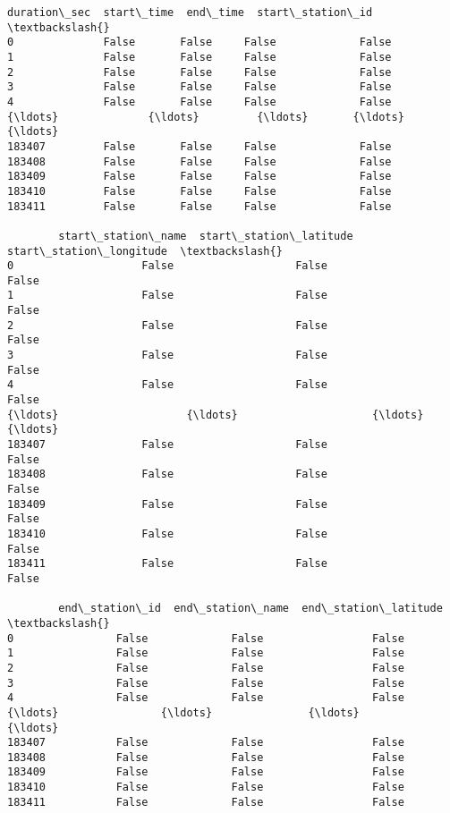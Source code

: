 \documentclass[11pt]{article}
\makeatletter
\newcommand{\boxspacing}{\kern\kvtcb@left@rule\kern\kvtcb@boxsep}
\newcommand{\prompt}[4]{
        {\ttfamily\llap{{\color{#2}[#3]:\hspace{3pt}#4}}\vspace{-\baselineskip}}
    }
\makeatother
\begin{document}
            \begin{tcolorbox}[breakable, size=fbox, boxrule=.5pt, pad at break*=1mm, opacityfill=0]
\prompt{Out}{outcolor}{11}{\boxspacing}
\begin{Verbatim}[commandchars=\\\{\}]
        duration\_sec  start\_time  end\_time  start\_station\_id  \textbackslash{}
0              False       False     False             False
1              False       False     False             False
2              False       False     False             False
3              False       False     False             False
4              False       False     False             False
{\ldots}              {\ldots}         {\ldots}       {\ldots}               {\ldots}
183407         False       False     False             False
183408         False       False     False             False
183409         False       False     False             False
183410         False       False     False             False
183411         False       False     False             False

        start\_station\_name  start\_station\_latitude  start\_station\_longitude  \textbackslash{}
0                    False                   False                    False
1                    False                   False                    False
2                    False                   False                    False
3                    False                   False                    False
4                    False                   False                    False
{\ldots}                    {\ldots}                     {\ldots}                      {\ldots}
183407               False                   False                    False
183408               False                   False                    False
183409               False                   False                    False
183410               False                   False                    False
183411               False                   False                    False

        end\_station\_id  end\_station\_name  end\_station\_latitude  \textbackslash{}
0                False             False                 False
1                False             False                 False
2                False             False                 False
3                False             False                 False
4                False             False                 False
{\ldots}                {\ldots}               {\ldots}                   {\ldots}
183407           False             False                 False
183408           False             False                 False
183409           False             False                 False
183410           False             False                 False
183411           False             False                 False


\end{Verbatim}
\end{tcolorbox}
\end{document}
